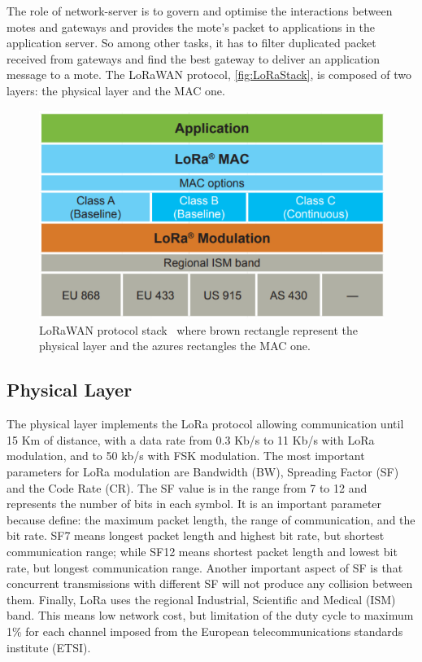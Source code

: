 The role of network-server is to govern and optimise the interactions between motes and gateways and provides the mote's packet to applications in the application server.
% 
So among other tasks, it has to filter duplicated packet received from gateways and find the best gateway to deliver an application message to a mote.
% 
The LoRaWAN protocol, \autoref{fig:LoRaStack}, is composed of two layers: the  physical layer and the MAC one.

\begin{figure}[h]
    \centering
    \includegraphics{figures/loraStack.png}
    \caption[LoRaWAN protocol stack]{LoRaWAN protocol stack~\cite{loraalliance2020} where brown rectangle represent the physical layer and the azures rectangles the MAC one.}
    \label{fig:LoRaStack}
\end{figure}

\subsection{Physical Layer}
The physical layer implements the LoRa protocol allowing communication until 15 Km of distance, with a data rate from 0.3 Kb/s to 11 Kb/s with LoRa modulation, and to 50 kb/s with FSK modulation.
% 
The most important parameters for LoRa modulation are Bandwidth (BW), Spreading Factor (SF) and the Code Rate (CR).
% 
The SF value is in the range from 7 to 12 and represents the number of bits in each symbol.
% 
It is an important parameter because define: the maximum packet length, the range of communication, and the bit rate.
% 
SF7 means longest packet length and highest bit rate, but shortest communication range; while SF12 means shortest packet length and lowest bit rate, but longest communication range.
% 
Another important aspect of SF is that concurrent transmissions with different SF will not produce any collision between them.
% 
Finally, LoRa uses the regional Industrial, Scientific and Medical (ISM) band. This means low network cost, but limitation of the duty \mbox{cycle} to maximum 1\% for each channel imposed from the European telecommunications standards institute (ETSI).

